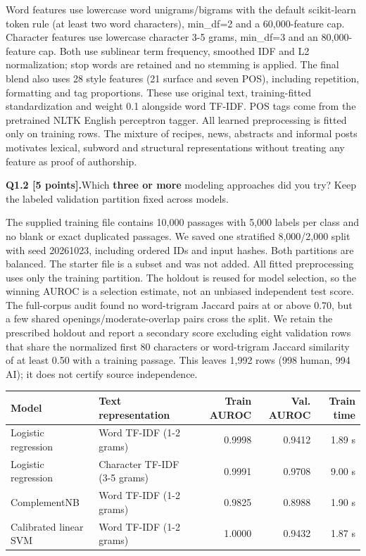 \documentclass[11pt,letterpaper]{article}
\newcommand{\question}[2]{\needspace{4\baselineskip}\par\addvspace{0.45em}\noindent\textbf{#1}\quad #2\par\nobreak\vspace{0.1em}}
\begin{document}
Word features use lowercase word unigrams/bigrams with the default scikit-learn token rule (at least two word characters), min\_df=2 and a 60,000-feature cap. Character features use lowercase character 3-5 grams, min\_df=3 and an 80,000-feature cap. Both use sublinear term frequency, smoothed IDF and L2 normalization; stop words are retained and no stemming is applied. The final blend also uses 28 style features (21 surface and seven POS), including repetition, formatting and tag proportions. These use original text, training-fitted standardization and weight 0.1 alongside word TF-IDF. POS tags come from the pretrained NLTK English perceptron tagger. All learned preprocessing is fitted only on training rows. The mixture of recipes, news, abstracts and informal posts motivates lexical, subword and structural representations without treating any feature as proof of authorship.

\question{Q1.2 [5 points].}{Which \textbf{three or more} modeling approaches did you try? Keep the labeled validation partition fixed across models.}

The supplied training file contains 10,000 passages with 5,000 labels per class and no blank or exact duplicated passages. We saved one stratified 8,000/2,000 split with seed 20261023, including ordered IDs and input hashes. Both partitions are balanced. The starter file is a subset and was not added. All fitted preprocessing uses only the training partition. The holdout is reused for model selection, so the winning AUROC is a selection estimate, not an unbiased independent test score. The full-corpus audit found no word-trigram Jaccard pairs at or above 0.70, but a few shared openings/moderate-overlap pairs cross the split. We retain the prescribed holdout and report a secondary score excluding eight validation rows that share the normalized first 80 characters or word-trigram Jaccard similarity of at least 0.50 with a training passage. This leaves 1,992 rows (998 human, 994 AI); it does not certify source independence.

\begin{center}\small\begin{tabular}{>{\raggedright\arraybackslash}p{2.8cm}>{\raggedright\arraybackslash}p{3.5cm}rrr}
\toprule
Model & Text representation & Train AUROC & Val. AUROC & Train time \\
\midrule
Logistic regression & Word TF-IDF (1-2 grams) & 0.9998 & 0.9412 & 1.89 s \\
Logistic regression & Character TF-IDF (3-5 grams) & 0.9991 & 0.9708 & 9.00 s \\
ComplementNB & Word TF-IDF (1-2 grams) & 0.9825 & 0.8988 & 1.90 s \\
Calibrated linear SVM & Word TF-IDF (1-2 grams) & 1.0000 & 0.9432 & 1.87 s \\
\bottomrule\end{tabular}\end{center}
\end{document}

